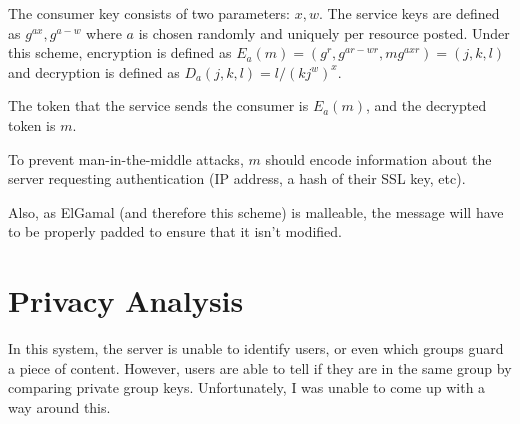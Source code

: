 \documentclass[pdftex,12pt,a4papaer]{article}
\begin{document}
The consumer key consists of two parameters: $x, w$.  The service keys are
defined as $g^{ax}, g^{a-w}$ where $a$ is chosen randomly and uniquely per
resource posted. Under this scheme, encryption is defined as $E_a(m) = (g^r,
g^{ar-wr}, mg^{axr}) = (j,k,l)$ and decryption is defined as $D_a(j, k, l) =
l/(kj^w)^x$.

The token that the service sends the consumer is $E_a(m)$, and the decrypted
token is $m$.

To prevent man-in-the-middle attacks, $m$ should encode information about the
server requesting authentication (IP address, a hash of their SSL key, etc).

Also, as ElGamal (and therefore this scheme) is malleable, the message will have
to be properly padded to ensure that it isn't modified.

\section{Privacy Analysis}

In this system, the server is unable to identify users, or even which groups
guard a piece of content. However, users are able to tell if they are in the
same group by comparing private group keys. Unfortunately, I was unable to come
up with a way around this.

\pagebreak
\end{document}
